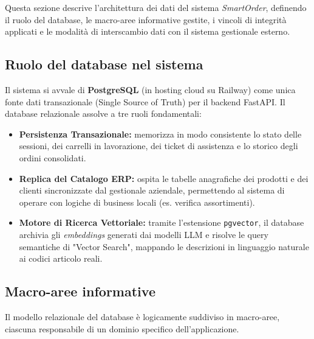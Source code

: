\documentclass[a4paper, 11pt, oneside]{scrartcl}
\begin{document}
Questa sezione descrive l'architettura dei dati del sistema \textit{SmartOrder}, definendo il ruolo del database, le macro-aree informative gestite, i vincoli di integrità applicati e le modalità di interscambio dati con il sistema gestionale esterno.

\subsection{Ruolo del database nel sistema}
Il sistema si avvale di \textbf{PostgreSQL} (in hosting cloud su Railway) come unica fonte dati transazionale (Single Source of Truth) per il backend FastAPI. 
Il database relazionale assolve a tre ruoli fondamentali:
\begin{itemize}
    \item \textbf{Persistenza Transazionale:} memorizza in modo consistente lo stato delle sessioni, dei carrelli in lavorazione, dei ticket di assistenza e lo storico degli ordini consolidati.
    \item \textbf{Replica del Catalogo ERP:} ospita le tabelle anagrafiche dei prodotti e dei clienti sincronizzate dal gestionale aziendale, permettendo al sistema di operare con logiche di business locali (es. verifica assortimenti).
    \item \textbf{Motore di Ricerca Vettoriale:} tramite l'estensione \texttt{pgvector}, il database archivia gli \textit{embeddings} generati dai modelli LLM e risolve le query semantiche di "Vector Search", mappando le descrizioni in linguaggio naturale ai codici articolo reali.
\end{itemize}

\subsection{Macro-aree informative}
Il modello relazionale del database è logicamente suddiviso in macro-aree, ciascuna responsabile di un dominio specifico dell'applicazione.
\end{document}

